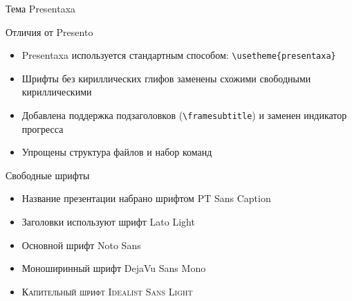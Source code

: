 \begin{frame}{Тема Presentaxa}
\end{frame}

\begin{frame}{Отличия от Presento}
\begin{itemize}
    \PresentaxaFullPageItemize
    \item Presentaxa используется стандартным способом: \texttt{\textbackslash usetheme\{presentaxa\}}
    \item Шрифты без кириллических глифов заменены схожими свободными кириллическими
    \item Добавлена поддержка подзаголовков (\texttt{\textbackslash framesubtitle}) и заменен индикатор прогресса
    \item Упрощены структура файлов и набор команд
\end{itemize}
\end{frame}

\begin{frame}{Свободные шрифты}
\begin{itemize}
    \PresentaxaFullPageItemize
    \item {\ptsansfont Название презентации набрано шрифтом PT Sans Caption}
    \item {\latolightfont Заголовки используют шрифт Lato Light}
    \item {\notosansfont Основной шрифт Noto Sans}
    \item {\dejavumonofont Моноширинный шрифт DejaVu Sans Mono}
    \item \textsc{Капительный шрифт Idealist Sans Light}
\end{itemize}
\end{frame}

